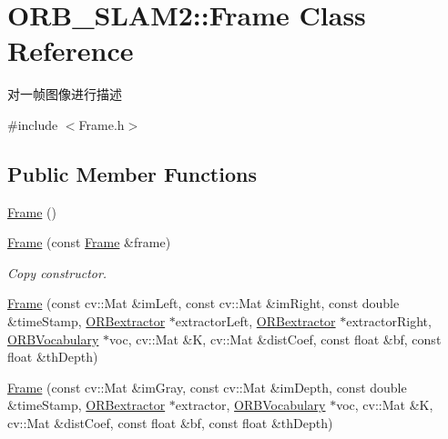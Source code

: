 \hypertarget{class_o_r_b___s_l_a_m2_1_1_frame}{}\section{O\+R\+B\+\_\+\+S\+L\+A\+M2\+:\+:Frame Class Reference}
\label{class_o_r_b___s_l_a_m2_1_1_frame}


对一帧图像进行描述  




{\ttfamily \#include $<$Frame.\+h$>$}

\subsection*{Public Member Functions}
\begin{DoxyCompactItemize}
\item 
\mbox{\hyperlink{class_o_r_b___s_l_a_m2_1_1_frame_aa43d601e841ddb7a9f100b0b9afd3b10}{Frame}} ()
\item 
\mbox{\hyperlink{class_o_r_b___s_l_a_m2_1_1_frame_ac7e6ed9973b81ec85e91228e3d4ecf22}{Frame}} (const \mbox{\hyperlink{class_o_r_b___s_l_a_m2_1_1_frame}{Frame}} \&frame)
\begin{DoxyCompactList}\small\item\em Copy constructor. \end{DoxyCompactList}\item 
\mbox{\hyperlink{class_o_r_b___s_l_a_m2_1_1_frame_a24d3c1a1a811fa0f9d44e717a044b2a4}{Frame}} (const cv\+::\+Mat \&im\+Left, const cv\+::\+Mat \&im\+Right, const double \&time\+Stamp, \mbox{\hyperlink{class_o_r_b___s_l_a_m2_1_1_o_r_bextractor}{O\+R\+Bextractor}} $\ast$extractor\+Left, \mbox{\hyperlink{class_o_r_b___s_l_a_m2_1_1_o_r_bextractor}{O\+R\+Bextractor}} $\ast$extractor\+Right, \mbox{\hyperlink{namespace_o_r_b___s_l_a_m2_a2fafba714858cab1bb18d438e2e83c5d}{O\+R\+B\+Vocabulary}} $\ast$voc, cv\+::\+Mat \&K, cv\+::\+Mat \&dist\+Coef, const float \&bf, const float \&th\+Depth)
\item 
\mbox{\hyperlink{class_o_r_b___s_l_a_m2_1_1_frame_ac205fd2081c647e4841369828902f8fe}{Frame}} (const cv\+::\+Mat \&im\+Gray, const cv\+::\+Mat \&im\+Depth, const double \&time\+Stamp, \mbox{\hyperlink{class_o_r_b___s_l_a_m2_1_1_o_r_bextractor}{O\+R\+Bextractor}} $\ast$extractor, \mbox{\hyperlink{namespace_o_r_b___s_l_a_m2_a2fafba714858cab1bb18d438e2e83c5d}{O\+R\+B\+Vocabulary}} $\ast$voc, cv\+::\+Mat \&K, cv\+::\+Mat \&dist\+Coef, const float \&bf, const float \&th\+Depth)

\end{DoxyCompactItemize}
